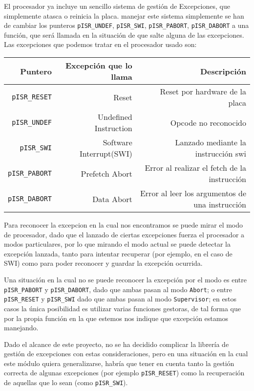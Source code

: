 \documentclass[12pt,letterpaper]{article}
\begin{document}
El procesador ya incluye un sencillo sistema de gestión de
Excepciones, que simplemente atasca o reinicia la placa. manejar este
sistema simplemente se han de cambiar los punteros
\texttt{pISR\_UNDEF}, \texttt{pISR\_SWI}, \texttt{pISR\_PABORT},
\texttt{pISR\_DABORT} a una función, que será llamada en la situación
de que salte alguna de las excepciones.
Las excepciones que podemos tratar en el procesador usado son:
  \begin{center}
    \begin{tabular}{ r | r | r}
      Puntero                & Excepción que lo llama  & Descripción                                     \\
      \hline
      \texttt{pISR\_RESET}   & Reset                   & Reset por hardware de la placa                  \\
      \texttt{pISR\_UNDEF}   & Undefined Instruction   & Opcode no reconocido                            \\
      \texttt{pISR\_SWI}     & Software Interrupt(SWI) & Lanzado mediante la instrucción swi             \\
      \texttt{pISR\_PABORT}  & Prefetch Abort          & Error al realizar el fetch de la instrucción    \\
      \texttt{pISR\_DABORT}  & Data Abort              & Error al leer los argumentos de una instrucción \\
    \end{tabular}
  \end{center}

Para reconocer la excepcion en la cual nos encontramos se puede mirar
el modo de procesador, dado que el lanzado de ciertas excepciones
fuerza el procesador a modos particulares, por lo que mirando el modo
actual se puede detectar la excepción lanzada, tanto para intentar
recuperar (por ejemplo, en el caso de SWI) como para poder reconocer y
guardar la excepción ocurrida.

Una situación en la cual no se puede reconocer la excepción por el
modo es entre \texttt{pISR\_PABORT} y \texttt{pISR\_DABORT}, dado que
ambas pasan al modo \texttt{Abort}; o entre \texttt{pISR\_RESET} y
\texttt{pISR\_SWI} dado que ambas pasan al modo \texttt{Supervisor};
en estos casos la única posibilidad es utilizar varias funciones
gestoras, de tal forma que por la propia función en la que estemos nos
indique que excepción estamos manejando.

Dado el alcance de este proyecto, no se ha decidido complicar la
librería de gestión de excepciones con estas consideraciones, pero en
una situación en la cual este módulo quiera generalizarse, habría que
tener en cuenta tanto la gestión correcta de algunas excepciones (por
ejemplo \texttt{pISR\_RESET}) como la recuperación de aquellas que lo
sean (como \texttt{pISR\_SWI}).
\end{document}
